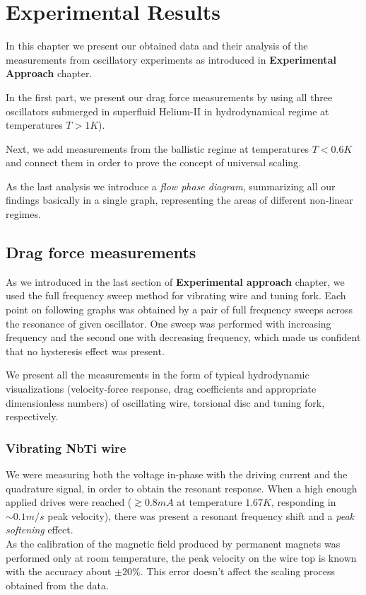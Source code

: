 \chapter{Experimental Results}

In this chapter we present our obtained data and their analysis of the measurements from oscillatory experiments as introduced in \textbf{Experimental Approach} chapter.

In the first part, we present our drag force measurements by using all three oscillators submerged in superfluid Helium-II in hydrodynamical regime at temperatures $T > 1 \unit{K}$).

Next, we add measurements from the ballistic regime at temperatures $T < 0.6 \unit{K}$ and connect them in order to prove the concept of universal scaling.

As the last analysis we introduce a \textit{flow phase diagram}, summarizing all our findings basically in a single graph, representing the areas of different non-linear regimes.

\newpage

\section{Drag force measurements}

As we introduced in the last section of \textbf{Experimental approach} chapter, we used the full frequency sweep method for vibrating wire and tuning fork. Each point on following graphs was obtained by a pair of full frequency sweeps across the resonance of given oscillator. One sweep was performed with increasing frequency and the second one with decreasing frequency, which made us confident that no hysteresis effect was present.

We present all the measurements in the form of typical hydrodynamic visualizations (velocity-force response, drag coefficients and appropriate dimensionless numbers) of oscillating wire, torsional disc and tuning fork, respectively.

\subsection{Vibrating NbTi wire}

We were measuring both the voltage in-phase with the driving current and the quadrature signal, in order to obtain the resonant response. When a high enough applied drives were reached ($\gtrsim 0.8 \unit{mA}$ at temperature $1.67\unit{K}$, responding in $\sim 0.1 \unit{m/s}$ peak velocity), there was present a resonant frequency shift and a \textit{peak softening} effect.\\
As the calibration of the magnetic field produced by permanent magnets was performed only at room temperature, the peak velocity on the wire top is known with the accuracy about $\pm 20 \%$. This error doesn't affect the scaling process obtained from the data.

